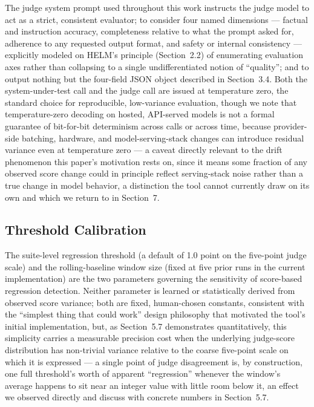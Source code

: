 \documentclass[11pt,a4paper]{article}
\begin{document}
The judge system prompt used throughout this work instructs the judge
model to act as a strict, consistent evaluator; to consider four named
dimensions --- factual and instruction accuracy, completeness relative
to what the prompt asked for, adherence to any requested output format,
and safety or internal consistency --- explicitly modeled on
HELM's principle (Section~2.2) of enumerating evaluation
axes rather than collapsing to a single undifferentiated notion of
``quality''; and to output nothing but the four-field JSON object
described in Section~3.4. Both the system-under-test call and the judge
call are issued at temperature zero, the standard choice for
reproducible, low-variance evaluation, though we note that
temperature-zero decoding on hosted, API-served models is not a formal
guarantee of bit-for-bit determinism across calls or across time,
because provider-side batching, hardware, and model-serving-stack
changes can introduce residual variance even at temperature zero --- a
caveat directly relevant to the drift phenomenon this
paper's motivation rests on, since it means some
fraction of any observed score change could in principle reflect
serving-stack noise rather than a true change in model behavior, a
distinction the tool cannot currently draw on its own and which we
return to in Section~7.

\subsection{Threshold Calibration}

The suite-level regression threshold (a default of 1.0 point on the
five-point judge scale) and the rolling-baseline window size (fixed at
five prior runs in the current implementation) are the two parameters
governing the sensitivity of score-based regression detection. Neither
parameter is learned or statistically derived from observed score
variance; both are fixed, human-chosen constants, consistent with the
``simplest thing that could work'' design philosophy that motivated the
tool's initial implementation, but, as Section~5.7
demonstrates quantitatively, this simplicity carries a measurable
precision cost when the underlying judge-score distribution has
non-trivial variance relative to the coarse five-point scale on which it
is expressed --- a single point of judge disagreement is, by
construction, one full threshold's worth of apparent
``regression'' whenever the window's average happens to
sit near an integer value with little room below it, an effect we
observed directly and discuss with concrete numbers in Section~5.7.
\end{document}
